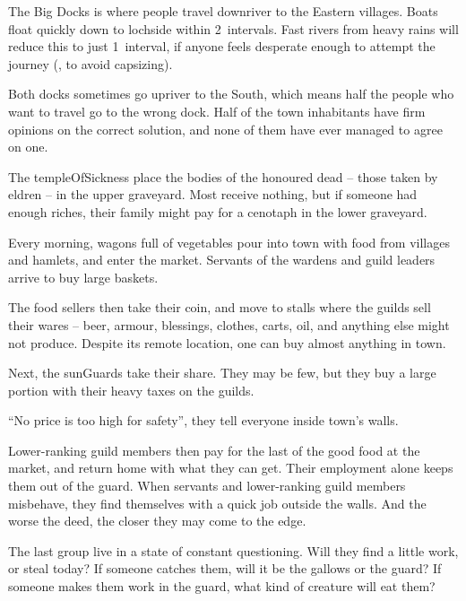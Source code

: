 \begin{multicols}{2}
The Big Docks is where people travel downriver to the Eastern \glspl{village}.
Boats float quickly down to \gls{lochside} within 2~\glspl{interval}.
Fast rivers from heavy rains will reduce this to just 1~\gls{interval}, if anyone feels desperate enough to attempt the journey (, \tn[12] to avoid capsizing).

Both docks sometimes go upriver to the South, which means half the people who want to travel go to the wrong dock.
Half of the \gls{town} inhabitants have firm opinions on the correct solution, and none of them have ever managed to agree on one.


The \gls{templeOfSickness} place the bodies of the honoured dead -- those taken by \gls{eldren} -- in the upper graveyard.
Most receive nothing, but if someone had enough riches, their family might pay for a cenotaph in the lower graveyard.


Every morning, wagons full of vegetables pour into \gls{town} with food from \glspl{village} and hamlets, and enter the market.
Servants of the \glspl{warden} and guild leaders arrive to buy large baskets.

The food sellers then take their coin, and move to stalls where the guilds sell their wares -- beer, armour, blessings, clothes, carts, oil, and anything else  might not produce.
Despite its remote location, one can buy almost anything in \gls{town}.

Next, the \glspl{sunGuard} take their share.
They may be few, but they buy a large portion with their heavy taxes on the guilds.

``No price is too high for safety'', they tell everyone inside \gls{town}'s walls.

Lower-ranking guild members then pay for the last of the good food at the market, and return home with what they can get.
Their employment alone keeps them out of the \gls{guard}.
When servants and lower-ranking guild members misbehave, they find themselves with a quick job outside the walls.
And the worse the deed, the closer they may come to the \gls{edge}.

The last group live in a state of constant questioning.
Will they find a little work, or steal today?
If someone catches them, will it be the gallows or the guard?
If someone makes them work in the \gls{guard}, what kind of creature will eat them?


\end{multicols}
